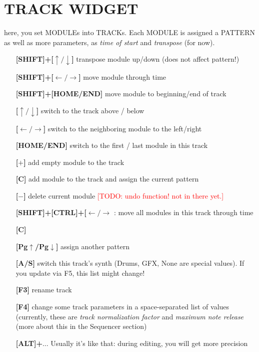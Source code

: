 \documentclass[11pt]{article}
\begin{document}
\section{TRACK WIDGET}
    here, you set MODULEs into TRACKs. Each MODULE is assigned a PATTERN as well as more parameters, as \emph{time of start} and \emph{transpose} (for now).
    \begin{itemize}
            \item[\textbf{[SHIFT]+[$\uparrow\!/\!\downarrow$]}] transpose module up/down (does not affect pattern!)
            \item[\textbf{[SHIFT]+[$\leftarrow\!/\!\rightarrow$]}] move module through time
            \item[\textbf{[SHIFT]+[HOME/END]}] move module to beginning/end of track
            \item[\textbf{[$\uparrow\!/\!\downarrow$]}] switch to the track above / below
            \item[\textbf{[$\leftarrow\!/\!\rightarrow$]}] switch to the neighboring module to the left/right
            \item[\textbf{[HOME/END]}] switch to the first / last module in this track
            \item[\textbf{[$+$]}] add empty module to the track
            \item[\textbf{[C]}] add module to the track and assign the current pattern
            \item[\textbf{[$-$]}] delete current module \textcolor{red}{[TODO: undo function! not in there yet.]}
            \item[\textbf{[SHIFT]+[CTRL]+[$\leftarrow\!/\!\rightarrow$}]: move all modules in this track through time
            \item[\textbf{[C]}] 
            \item[\textbf{[Pg$\uparrow$/Pg$\downarrow$]}] assign another pattern 
            \item[\textbf{[A/S]}] switch this track's synth (Drums, GFX, None are special values). If you update via F5, this list might change!
            \item[\textbf{[F3]}] rename track
            \item[\textbf{[F4]}] change some track parameters in a space-separated list of values (currently, these are \emph{track normalization factor} and \emph{maximum note release} (more about this in the Sequencer section) 
            
            \item[\textbf{[ALT]+$\ldots$}]     Usually it's like that: during editing, you will get more precision
    \end{itemize}
\end{document}
